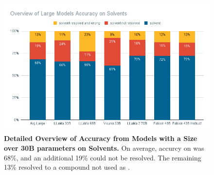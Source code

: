 \begin{figure}[!htbp]
    \begin{centering}
        \includegraphics[width=\textwidth]{img/overview_large_solv}
        \caption[Large Models Detailed Solvent Accuracy]{\textbf{Detailed Overview of Accuracy from Models with a Size over 30B parameters on Solvents.}
            On average, accurcy on \tsolv was 68\%, and an additional 19\% could not be resolved. The remaining 13\% resolved to a compound not used as \tsolv.
        }
        \label{fig:large_solv}
    \end{centering}
\end{figure}
